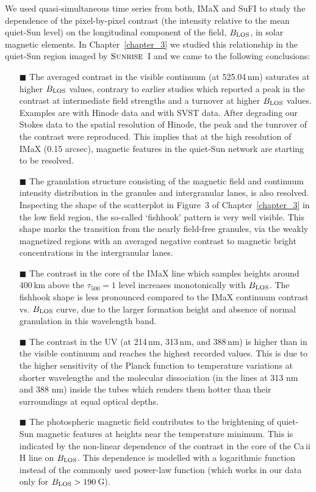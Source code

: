 \documentclass[goettingen, gauss, print]{thesis}
\begin{document}
We used quasi-simultaneous time series from both, IMaX and SuFI to study the dependence of the pixel-by-pixel contrast (the intensity relative to the mean quiet-Sun level) on the longitudinal component of the field, $B_{\rm LOS}$, in solar magnetic elements. In Chapter~\ref{chapter_3} we studied this relationship in the quiet-Sun region imaged by $\textsc{Sunrise}$~I and we came to the following conclusions:
\begin{itemize}
\item[$\blacksquare$] The averaged contrast in the visible continuum (at 525.04\,nm) saturates at higher $B_{\rm LOS}$ values, contrary to earlier studies which reported a peak in the contrast at intermediate field strengths and a turnover at higher $B_{\rm LOS}$ values. Examples are \cite{kobel_continuum_2011} with Hinode data and \cite{lawrence_contrast_1993} with SVST data. After degrading our Stokes data to the spatial resolution of Hinode, the peak and the tunrover of the contrast were reproduced. This implies that at the high resolution of IMaX (0.15 arcsec), magnetic features in the quiet-Sun network are starting to be resolved. 
\item[$\blacksquare$] The granulation structure consisting of the magnetic field and continuum intensity distribution in the granules and intergranular lanes, is also resolved. Inspecting the shape of the scatterplot in Figure~3 of Chapter~\ref{chapter_3} in the low field region, the so-called `fishhook' pattern \citep{schnerr_brightness_2011} is very well visible. This shape marks the transition from the nearly field-free granules, via the weakly magnetized regions with an averaged negative contrast to magnetic bright concentrations in the intergranular lanes.
\item[$\blacksquare$] The contrast in the core of the IMaX line which samples heights around 400\,km above the $\tau_{500} = 1$ level \citep{jafarzadeh_inclinations_2014} increases monotonically with $B_{\rm LOS}$. The fishhook shape is less pronounced compared to the IMaX continuum contrast vs. $B_{\rm LOS}$ curve, due to the larger formation height and absence of normal granulation in this wavelength band.
\item[$\blacksquare$] The contrast in the UV (at 214\,nm, 313\,nm, and 388\,nm) is higher than in the visible continuum and reaches the highest recorded values. This is due to the higher sensitivity of the Planck function to temperature variations at shorter wavelengths and the molecular dissociation (in the lines at 313 nm and 388 nm) inside the tubes which renders them hotter than their surroundings at equal optical depths.
\item[$\blacksquare$] The photospheric magnetic field contributes to the brightening of quiet-Sun magnetic features at heights near the temperature minimum. This is indicated by the non-linear dependence of the contrast in the core of the Ca\,{\sc ii} H line on $B_{\rm LOS}$. This dependence is modelled with a logarithmic function instead of the commonly used power-law function (which works in our data only for $B_{\rm LOS}>190$\,G).
\end{itemize} 
\end{document}

